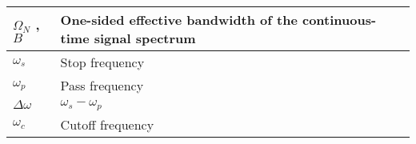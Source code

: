 \begin{xltabular}{\textwidth}{XX}
	\(\Omega_N\) \cite{oppenheimDiscreteTimeSignalProcessing2009}, \(B\)                                  & One-sided effective bandwidth of the continuous-time signal spectrum                                                                                                                                                                                                                                                                                                                                                                                     \\ \hline
	\(\omega_s\) \cite{ingleDigitalSignalProcessing2000}                                                  & Stop frequency                                                                                                                                                                                                                                                                                                                                                                                                                                           \\ \hline
	\(\omega_p\) \cite{ingleDigitalSignalProcessing2000}                                                  & Pass frequency                                                                                                                                                                                                                                                                                                                                                                                                                                           \\ \hline
	\(\Delta \omega\) \cite{ingleDigitalSignalProcessing2000}                                             & \(\omega_s - \omega_p\)                                                                                                                                                                                                                                                                                                                                                                                                                                  \\ \hline
	\(\omega_c\) \cite{ingleDigitalSignalProcessing2000}                                                  & Cutoff frequency                                                                                                                                                                                                                                                                                                                                                                                                                                         \\ \hline

\end{xltabular}
